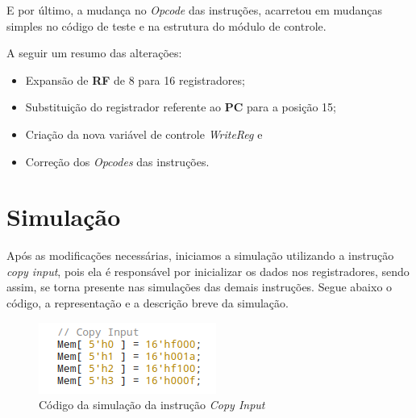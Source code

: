 \documentclass[12pt, a4paper]{article}
\begin{document}
    \vspace{\baselineskip}
    
    \par E por último, a mudança no \textit{Opcode} das instruções, acarretou em mudanças simples no código de teste e na estrutura do módulo de controle.

    \vspace{\baselineskip}

    \par A seguir um resumo das alterações:
    
    \begin{itemize}
		\item Expansão de \textbf{RF} de 8 para 16 registradores;

        \item Substituição do registrador referente ao \textbf{PC} para a posição 15;

        \item Criação da nova variável de controle \textit{WriteReg} e
        
        \item Correção dos \textit{Opcodes} das instruções.
    \end{itemize}

    \section{Simulação}
    
    \par Após as modificações necessárias, iniciamos a simulação utilizando a instrução \textit{copy input}, pois ela é responsável por inicializar os dados nos registradores, sendo assim, se torna presente nas simulações das demais instruções. Segue abaixo o código, a representação e a descrição breve da simulação.

    \vspace{\baselineskip}
    
    \begin{figure}[!h]
        \centering
        \includegraphics{./COPY_INPUT/copy_input_code}
        \caption{Código da simulação da instrução \textit{Copy Input}}
	    \label{fig: copy input code}
    \end{figure}
\end{document}
